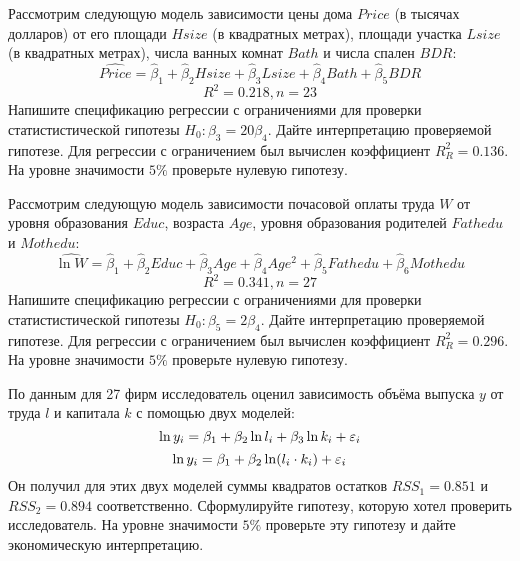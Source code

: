 \documentclass[pdftex,11pt,openany]{book}\usepackage[]{graphicx}\usepackage[]{color}
\begin{document}
\begin{problem}
 Рассмотрим следующую модель зависимости цены дома $Price$ (в тысячах долларов) от его площади $Hsize$ (в квадратных метрах), площади участка $Lsize$ (в квадратных метрах), числа ванных комнат $Bath$ и числа спален $BDR$:
\[
\widehat{Price} = \hat{\beta}_1 + \hat{\beta}_2 Hsize + \hat{\beta}_3 Lsize + \hat{\beta}_4 Bath + \hat{\beta}_5 BDR
\]
\[
R^2 = 0.218, n = 23
\]
Напишите спецификацию регрессии с ограничениями для проверки статистистической гипотезы $H_0: \beta_3 = 20\beta_4$. Дайте интерпретацию проверяемой гипотезе. Для регрессии с ограничением был вычислен коэффициент $R_{R}^2 = 0.136$. На уровне значимости $5\%$ проверьте нулевую гипотезу.
\end{problem}

\begin{solution}
\end{solution}


\begin{problem}
 Рассмотрим следующую модель зависимости почасовой оплаты труда $W$ от уровня образования $Educ$, возраста $Age$, уровня образования родителей $Fathedu$ и $Mothedu$:
\[
\widehat{\ln W} = \hat{\beta}_1 + \hat{\beta}_2 Educ + \hat{\beta}_3 Age + \hat{\beta}_4 Age^2+ \hat{\beta}_5 Fathedu + \hat{\beta}_6 Mothedu
\]
\[
R^2 = 0.341, n = 27
\]
Напишите спецификацию регрессии с ограничениями для проверки статистистической гипотезы $H_0: \beta_5 = 2\beta_4$. Дайте интерпретацию проверяемой гипотезе. Для регрессии с ограничением был вычислен коэффициент $R_{R}^2 = 0.296$. На уровне значимости $5\%$ проверьте нулевую гипотезу.
\end{problem}

\begin{solution}
\end{solution}


\begin{problem}
 По данным для 27 фирм исследователь оценил зависимость объёма выпуска $y$ от труда $l$ и капитала $k$ с помощью двух моделей:
\[
\ln y_i = \beta_1 + \beta_2 \ln l_i + \beta_3 \ln k_i + \varepsilon_i
\]
\[
\ln y_i = \beta_1 + \beta_2 \ln (l_i \cdot k_i) + \varepsilon_i
\]
Он получил для этих двух моделей суммы квадратов остатков $RSS_1 = 0.851$ и $RSS_2 = 0.894$ соответственно. Сформулируйте гипотезу, которую хотел проверить исследователь. На уровне значимости $5\%$ проверьте эту гипотезу и дайте экономическую интерпретацию.
\end{problem}

\begin{solution}
\end{solution}
\end{document}
